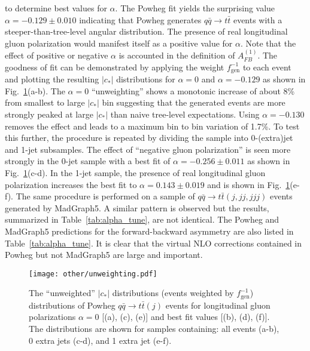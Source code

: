 to determine best values for $\alpha$.  The Powheg fit yields the surprising value $\alpha = -0.129\pm0.010$ indicating that Powheg generates $q\bar q\to t\bar t$ events with a steeper-than-tree-level angular distribution.  The presence of real longitudinal gluon polarization would manifest itself as a positive value for $\alpha$.  Note that the effect of positive or negative $\alpha$ is accounted in the definition of $A_{FB}^{(1)}$.  The goodness of fit can be demonstrated by applying the weight $f^{-1}_\mathrm{gen}$ to each event and plotting the resulting $|c_*|$ distributions for $\alpha = 0$ and $\alpha = -0.129$ as shown in Fig.~\ref{fig:unweight_test}(a-b).  The $\alpha=0$ ``unweighting'' shows a monotonic increase of about 8\% from smallest to large $|c_*|$ bin suggesting that the generated events are more strongly peaked at large $|c_*|$ than naive tree-level expectations.  Using $\alpha = -0.130$ removes the effect and leads to a maximum bin to bin variation of 1.7\%.  To test this further, the procedure is repeated by dividing the sample into 0-(extra)jet and 1-jet subsamples.  The effect of ``negative gluon polarization'' is seen more strongly in the 0-jet sample with a best fit of $\alpha=-0.256\pm0.011$ as shown in Fig.~\ref{fig:unweight_test}(c-d).  In the 1-jet sample, the presence of real longitudinal gluon polarization increases the best fit to $\alpha=0.143\pm0.019$ and is shown in Fig.~\ref{fig:unweight_test}(e-f).  The same procedure is performed on a sample of $q\bar q \to t\bar t(j,jj,jjj)$ events generated by MadGraph5.  A similar pattern is observed but the results, summarized in Table~\ref{tab:alpha_tune}, are not identical.  The Powheg and MadGraph5 predictions for the forward-backward asymmetry are also listed in Table~\ref{tab:alpha_tune}.  It is clear that the virtual NLO corrections contained in Powheg but not MadGraph5 are large and important.

\begin{figure}[hbt]
	\begin{center}
		\texttt{[image: other/unweighting.pdf]}
		\caption{\small The ``unweighted'' $|c_*|$ distributions (events weighted by $f_\mathrm{gen}^{-1}$) distributions of Powheg $q\bar q\to t\bar t(j)$ events for longitudinal gluon polarizations $\alpha=0$ [(a), (c), (e)] and best fit values [(b), (d), (f)].  The distributions are shown for samples containing: all events (a-b), 0 extra jets (c-d), and 1 extra jet (e-f).}
		\label{fig:unweight_test}
	\end{center}
\end{figure}

